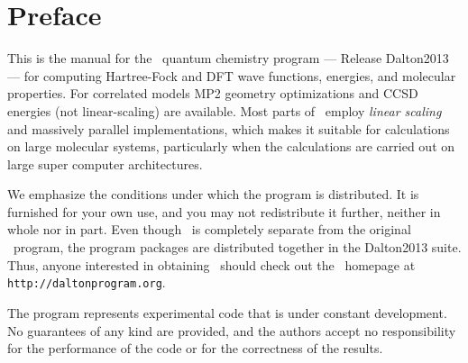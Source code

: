 
\chapter*{Preface}

This is the manual for the \lsdalton\ quantum chemistry program
--- Release Dalton2013 --- for computing Hartree-Fock and DFT
wave functions, energies, and molecular properties.
For correlated models MP2 geometry optimizations and CCSD energies (not linear-scaling) are available.
Most parts of \lsdalton\ employ {\em linear scaling} and massively parallel implementations, which makes it suitable for calculations on large molecular systems, particularly when the calculations are carried out on large super computer architectures.

We emphasize the conditions under which the
program is distributed.  It is furnished for your own use,
and you may not redistribute it further, neither in whole nor in
part.  Even though \lsdalton\ is completely separate from the original
\dalton\ program, the program packages are distributed together in the
Dalton2013 suite. Thus, 
anyone interested in obtaining \lsdalton\ should check out the
\dalton\ homepage at
\verb|http://daltonprogram.org|.


The program represents experimental code that is
under constant development.  No guarantees of any kind are
provided, and the authors accept no responsibility for the
performance of the code or for the correctness of the results.
